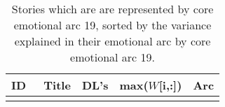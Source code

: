 \begin{longtable}{l | l | l | l | c}
ID & ~Title & DL's & max($W$[i,:]) & Arc\\
\hline
\endhead
\caption{Stories which are are represented by core emotional arc 19, sorted by the variance explained in their emotional arc by core emotional arc 19.}
\end{longtable}

